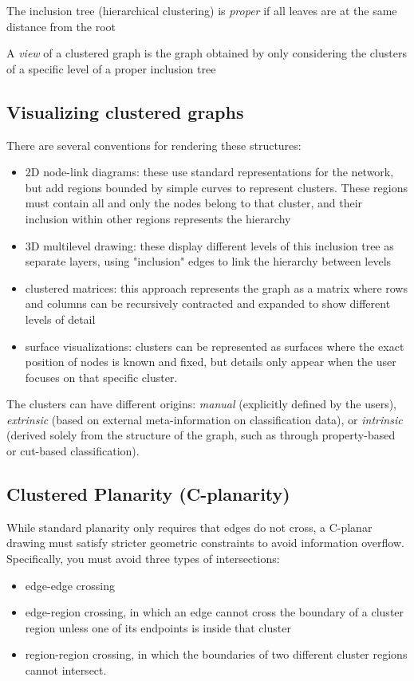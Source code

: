 \begin{definition}
    The inclusion tree (hierarchical clustering) is \emph{proper} if all leaves are at the same distance from the root
\end{definition}

\begin{definition}[view]
    A \emph{view} of a clustered graph is the graph obtained by only considering the clusters of a specific level of a proper inclusion tree 
\end{definition}

\subsection{Visualizing clustered graphs}
There are several conventions for rendering these structures:
\begin{itemize}[noitemsep]
    \item 2D node-link diagrams: these use standard representations for the network, but add regions bounded by simple curves to represent clusters. These regions must contain all and only the nodes belong to that cluster, and their inclusion within other regions represents the hierarchy
    \item 3D multilevel drawing: these display different levels of this inclusion tree as separate layers, using "inclusion" edges to link the hierarchy between levels
    \item clustered matrices: this approach represents the graph as a matrix where rows and columns can be recursively contracted and expanded to show different levels of detail
    \item surface visualizations: clusters can be represented as surfaces where the exact position of nodes is known and fixed, but details only appear when the user focuses on that specific cluster.
\end{itemize}

The clusters can have different origins: \textit{manual} (explicitly defined by the users), \textit{extrinsic} (based on external meta-information on classification data), or \textit{intrinsic} (derived solely from the structure of the graph, such as through property-based or cut-based classification).

\subsection{Clustered Planarity (C-planarity)}
While standard planarity only requires that edges do not cross, a C-planar drawing must satisfy stricter geometric constraints to avoid information overflow. Specifically, you must avoid three types of intersections:
\begin{itemize}[noitemsep]
    \item edge-edge crossing
    \item edge-region crossing, in which an edge cannot cross the boundary of a cluster region unless one of its endpoints is inside that cluster
    \item region-region crossing, in which the boundaries of two different cluster regions cannot intersect.
\end{itemize}

